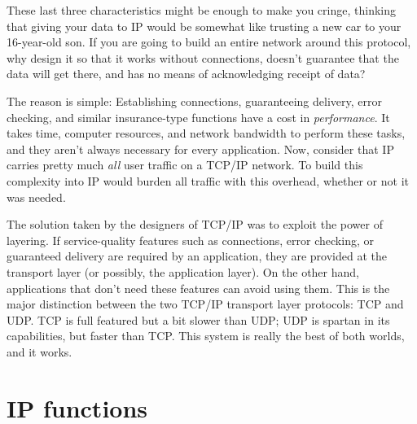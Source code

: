 These last three characteristics might be enough to make you cringe,
thinking that giving your data to IP would be somewhat like trusting a
new car to your 16-year-old son. If you are going to build an entire
network around this protocol, why design it so that it works without
connections, doesn't guarantee that the data will get there, and has no
means of acknowledging receipt of data?

The reason is simple: Establishing connections, guaranteeing delivery,
error checking, and similar insurance-type functions have
a cost in {\emph{performance}}. It takes time, computer resources, and
network bandwidth to perform these tasks, and they aren't always
necessary for every application. Now, consider that IP carries pretty
much {\emph{all}} user traffic on a TCP/IP network. To build this
complexity into IP would burden all traffic with this overhead, whether
or not it was needed.

The solution taken by the designers of TCP/IP was to exploit the power
of layering. If service-quality features such as connections, error
checking, or guaranteed delivery are required by an application, they
are provided at the transport layer (or possibly, the application
layer). On the other hand, applications that don't need these features
can avoid using them. This is the major distinction between the two
TCP/IP transport layer protocols: TCP and UDP. TCP is full featured but
a bit slower than UDP; UDP is spartan in its capabilities, but faster
than TCP. This system is really the best of both worlds, and it works.



\section{IP functions}

